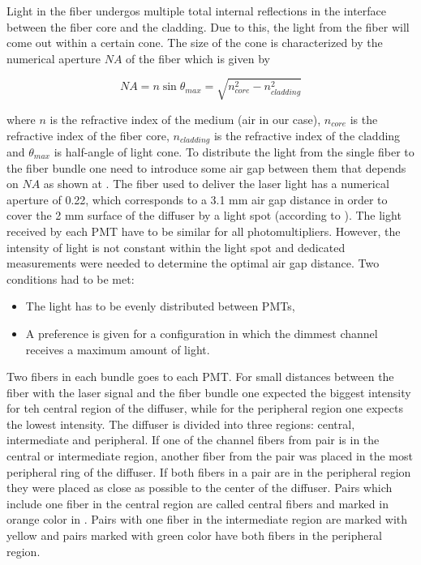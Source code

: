 Light in the fiber undergos multiple total internal reflections in the interface between the fiber core and the cladding. 
Due to this, the light from the fiber will come out within a certain cone. 
The size of the cone is characterized by the numerical aperture $NA$ of the fiber which is given by

\begin{equation}
\label{eq:numericalApperture}
 NA = n \sin{\theta_{max}} = \sqrt{n_{core}^2 - n_{cladding}^2}
\end{equation}

where $n$ is the refractive index of the medium (air in our case), $n_{core}$ is the refractive index of the fiber core, $n_{cladding}$ is the refractive index 
of the cladding and $\theta_{max}$ is half-angle of light cone. 
To distribute the light from the single fiber to the fiber bundle one need to introduce some air gap between them that depends on $NA$ 
as shown at .
The fiber used to deliver the laser light has a numerical aperture of 0.22, which corresponds to a 3.1 mm air gap distance 
in order to cover the 2 mm surface of the diffuser by a light spot (according to ).
The light received by each PMT have to be similar for all photomultipliers.
However, the intensity of light is not constant within the light spot and dedicated measurements were needed to determine the optimal air gap distance.
Two conditions had to be met:
\begin{itemize}
 \item The light has to be evenly distributed between PMTs,
 \item A preference is given for a configuration in which the dimmest channel receives a maximum amount of light.
\end{itemize}
Two fibers in each bundle goes to each PMT. 
For small distances between the fiber with the laser signal and the fiber bundle one expected the biggest intensity for teh central 
region of the diffuser, while for the peripheral region one expects the lowest intensity.
The diffuser is divided into three regions: central, intermediate and peripheral. 
If one of the channel fibers from pair is in the central or intermediate region, another fiber from the pair was placed in the most peripheral ring of the diffuser.
If both fibers in a pair are in the peripheral region they were placed as close as possible to the center of the diffuser.
Pairs which include one fiber in the central region are called central fibers and marked in orange color in .
Pairs with one fiber in the intermediate region are marked with yellow and pairs marked with green color have both fibers in the peripheral region.

